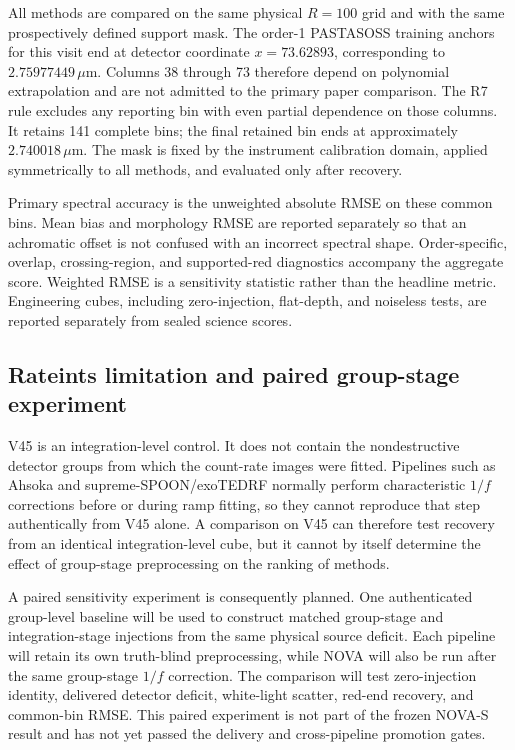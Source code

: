 All methods are compared on the same physical $R=100$ grid and with the same
prospectively defined support mask. The order-1 PASTASOSS training anchors for
this visit end at detector coordinate $x=73.62893$, corresponding to
$2.75977449\,\mu\mathrm{m}$. Columns 38 through 73 therefore depend on polynomial
extrapolation and are not admitted to the primary paper comparison. The R7 rule
excludes any reporting bin with even partial dependence on those columns. It
retains 141 complete bins; the final retained bin ends at approximately
$2.740018\,\mu\mathrm{m}$. The mask is fixed by the instrument calibration domain,
applied symmetrically to all methods, and evaluated only after recovery.

Primary spectral accuracy is the unweighted absolute RMSE on these common bins.
Mean bias and morphology RMSE are reported separately so that an achromatic
offset is not confused with an incorrect spectral shape. Order-specific,
overlap, crossing-region, and supported-red diagnostics accompany the aggregate
score. Weighted RMSE is a sensitivity statistic rather than the headline
metric. Engineering cubes, including zero-injection, flat-depth, and noiseless
tests, are reported separately from sealed science scores.

\subsection{Rateints limitation and paired group-stage experiment}

V45 is an integration-level control. It does not contain the nondestructive
detector groups from which the count-rate images were fitted. Pipelines such as
Ahsoka and supreme-SPOON/exoTEDRF normally perform characteristic $1/f$
corrections before or during ramp fitting, so they cannot reproduce that step
authentically from V45 alone. A comparison on V45 can therefore test recovery
from an identical integration-level cube, but it cannot by itself determine the
effect of group-stage preprocessing on the ranking of methods.

A paired sensitivity experiment is consequently planned. One authenticated
group-level baseline will be used to construct matched group-stage and
integration-stage injections from the same physical source deficit. Each
pipeline will retain its own truth-blind preprocessing, while NOVA will also be
run after the same group-stage $1/f$ correction. The comparison will test
zero-injection identity, delivered detector deficit, white-light scatter,
red-end recovery, and common-bin RMSE. This paired experiment is not part of the
frozen NOVA-S result and has not yet passed the delivery and cross-pipeline
promotion gates.

